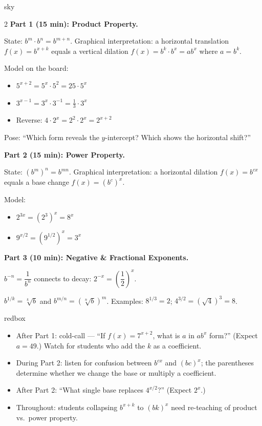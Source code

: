 \documentclass[10pt]{article}
\begin{document}
\begin{skillbox}[Lesson]{sky}
\begin{multicols}{2}
\textbf{Part 1 (15 min): Product Property.}

State: $b^m \cdot b^n = b^{m+n}$.
Graphical interpretation: a horizontal translation $f(x) = b^{x+k}$ equals a vertical
dilation $f(x) = b^k \cdot b^x = ab^x$ where $a = b^k$.

Model on the board:
\begin{itemize}[leftmargin=1.2em, itemsep=1pt, topsep=2pt]
  \item $5^{x+2} = 5^x \cdot 5^2 = 25 \cdot 5^x$
  \item $3^{x-1} = 3^x \cdot 3^{-1} = \tfrac{1}{3} \cdot 3^x$
  \item Reverse: $4 \cdot 2^x = 2^2 \cdot 2^x = 2^{x+2}$
\end{itemize}

Pose: ``Which form reveals the $y$-intercept? Which shows the horizontal shift?''

\columnbreak

\textbf{Part 2 (15 min): Power Property.}

State: $(b^m)^n = b^{mn}$.
Graphical interpretation: a horizontal dilation $f(x) = b^{cx}$ equals a base change
$f(x) = (b^c)^x$.

Model:
\begin{itemize}[leftmargin=1.2em, itemsep=1pt, topsep=2pt]
  \item $2^{3x} = (2^3)^x = 8^x$
  \item $9^{x/2} = (9^{1/2})^x = 3^x$
\end{itemize}

\textbf{Part 3 (10 min): Negative \& Fractional Exponents.}

$b^{-n} = \dfrac{1}{b^n}$ connects to decay:
$2^{-x} = \left(\dfrac{1}{2}\right)^x$.

$b^{1/k} = \sqrt[k]{b}$ and $b^{m/n} = (\sqrt[n]{b})^m$.
Examples: $8^{1/3} = 2$; $4^{3/2} = (\sqrt{4})^3 = 8$.
\end{multicols}
\end{skillbox}

\begin{skillbox}{redbox}
\begin{itemize}[leftmargin=1.2em,itemsep=2pt,topsep=0pt]
  \item After Part 1: cold-call --- ``If $f(x) = 7^{x+2}$, what is $a$ in $ab^x$ form?''
        (Expect $a = 49$.) Watch for students who add the $k$ as a coefficient.
  \item During Part 2: listen for confusion between $b^{cx}$ and $(bc)^x$; the parentheses
        determine whether we change the base or multiply a coefficient.
  \item After Part 2: ``What single base replaces $4^{x/2}$?'' (Expect $2^x$.)
  \item Throughout: students collapsing $b^{x+k}$ to $(bk)^x$ need re-teaching of product
        vs.\ power property.
\end{itemize}
\end{skillbox}
\end{document}
